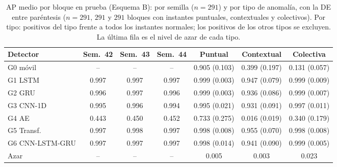 \begin{table}[t]\centering\footnotesize\setlength{\tabcolsep}{4pt}
\caption{AP medio por bloque en prueba (Esquema B): por semilla ($n=291$) y por tipo de anomal\'ia, con la DE entre par\'entesis ($n=291$, $291$ y $291$ bloques con instantes puntuales, contextuales y colectivos). Por tipo: positivos del tipo frente a todos los instantes normales; los positivos de los otros tipos se excluyen. La \'ultima fila es el nivel de azar de cada tipo.}
\label{tab:tipo}
\begin{tabular}{@{}lcccccc@{}}\toprule
Detector & Sem.\ 42 & Sem.\ 43 & Sem.\ 44 & Puntual & Contextual & Colectiva \\\midrule
G0 m\'ovil & -- & -- & -- & 0.905 (0.103) & 0.399 (0.197) & 0.131 (0.057) \\
G1 LSTM & 0.997 & 0.997 & 0.997 & 0.999 (0.003) & 0.947 (0.079) & 0.999 (0.009) \\
G2 GRU & 0.996 & 0.997 & 0.996 & 0.999 (0.003) & 0.936 (0.086) & 0.999 (0.007) \\
G3 CNN-1D & 0.995 & 0.996 & 0.994 & 0.995 (0.021) & 0.931 (0.091) & 0.997 (0.011) \\
G4 AE & 0.443 & 0.450 & 0.452 & 0.733 (0.275) & 0.016 (0.019) & 0.340 (0.179) \\
G5 Transf. & 0.997 & 0.998 & 0.997 & 0.998 (0.008) & 0.955 (0.070) & 0.998 (0.008) \\
G6 CNN-LSTM-GRU & 0.997 & 0.997 & 0.997 & 0.998 (0.014) & 0.941 (0.090) & 0.999 (0.005) \\
\midrule Azar & -- & -- & -- & 0.005 & 0.003 & 0.023 \\
\bottomrule\end{tabular}\end{table}


